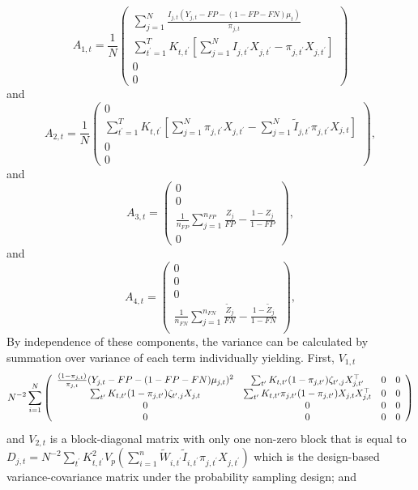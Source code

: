 \documentclass[12pt]{amsart}
\numberwithin{equation}{section}
\theoremstyle{plain}
\begin{document}
$$
A_{1,t} = \frac{1}{N} \left( \begin{array}{c}
\sum_{j=1}^N \frac{I_{j,t} (Y_{j,t} - FP - (1-FP-FN) \mu_t)}{\pi_{j,t}} \\
\sum_{t^\prime = 1}^T K_{t,t^\prime} \left[ \sum_{j=1}^N I_{j,t^\prime} X_{j,t^\prime} - \pi_{j,t^\prime} X_{j,t^\prime} \right] \\
0 \\
0
\end{array}
\right)
$$
and
$$
A_{2,t} = \frac{1}{N} \left( \begin{array}{c}
0 \\
\sum_{t^\prime = 1}^T K_{t,t^\prime} \left[ \sum_{j=1}^N \pi_{j,t^\prime} X_{j,t^\prime} - \sum_{j=1}^N \tilde I_{j,t^\prime} \pi_{j,t^\prime} X_{j,t} \right] \\
0 \\
0
\end{array}
\right),
$$
and
$$
A_{3,t} = \left( \begin{array}{c}
0 \\
0 \\
\frac{1}{n_{FP}} \sum_{j=1}^{n_{FP}} \frac{Z_j}{FP} - \frac{1-Z_j}{1-FP} \\
0
\end{array}
\right),
$$
and
$$
A_{4,t} = \left( \begin{array}{c}
0 \\
0 \\
0 \\
\frac{1}{n_{FN}} \sum_{j=1}^{n_{FN}} \frac{\tilde Z_j}{FN} - \frac{1-\tilde Z_j}{1-FN} \\
\end{array}
\right),
$$
By independence of these components, the variance can be calculated by summation over variance of each term individually yielding. First, $V_{1,t}$
{
\tiny
$$
 N^{-2} \sum_{i=1}^N \left(
\begin{array}{c c c c}
\frac{(1-\pi_{j,t})}{\pi_{j,t}} (Y_{j,t} - FP - (1-FP-FN) \mu_{j,t})^2 & \sum_{t^\prime} K_{t,t^\prime} (1-\pi_{j,t^\prime}) \zeta_{t^\prime, j} X_{j,t^\prime}^\top & 0 & 0 \\
\sum_{t^\prime} K_{t,t^\prime} (1-\pi_{j,t^\prime}) \zeta_{t^\prime, j} X_{j,t}&
\sum_{t^\prime} K_{t,t^\prime} \pi_{j,t^\prime} (1-\pi_{j,t^\prime}) X_{j,t} X_{j,t}^\top
& 0 & 0 \\
0 & 0 & 0 & 0 \\
0 & 0 & 0 & 0 \\
\end{array}
\right)
$$
}
and $V_{2,t}$ is a block-diagonal matrix with only one non-zero block that is equal to $D_{j,t} = N^{-2} \sum_{t^\prime} K_{t,t^\prime}^2 V_p\left( \sum_{i=1}^n \tilde W_{i,t^\prime} \tilde I_{i,t^\prime}  \pi_{j,t^\prime} X_{j,t^\prime} \right)$ which is the design-based variance-covariance matrix under the probability sampling design; and
\end{document}
